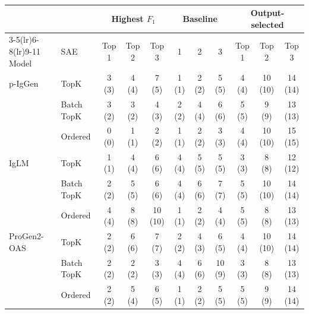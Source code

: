 \begin{table}[ht]
\centering\revcolor\footnotesize
\caption{}
\label{tab:rl_depth}
\setlength{\tabcolsep}{2.5pt}
\begin{tabular}{llccccccccc}
\toprule
 & & \multicolumn{3}{c}{Highest $F_1$} & \multicolumn{3}{c}{Baseline} & \multicolumn{3}{c}{Output-selected} \\
\cmidrule(lr){3-5}\cmidrule(lr){6-8}\cmidrule(lr){9-11}
Model & SAE & Top 1 & Top 2 & Top 3 & 1 & 2 & 3 & Top 1 & Top 2 & Top 3 \\
\midrule
p-IgGen & TopK & 3 (3) & 4 (4) & 7 (5) & 1 (1) & 2 (2) & 5 (5) & 4 (4) & 10 (10) & 14 (14) \\
 & Batch TopK & 3 (2) & 3 (2) & 4 (3) & 2 (2) & 4 (4) & 6 (6) & 5 (5) & 9 (9) & 13 (13) \\
 & Ordered & 0 (0) & 1 (1) & 2 (2) & 1 (1) & 2 (2) & 3 (3) & 4 (4) & 10 (10) & 15 (15) \\
\midrule
IgLM & TopK & 1 (1) & 4 (4) & 6 (6) & 4 (4) & 5 (5) & 5 (5) & 3 (3) & 8 (8) & 12 (12) \\
 & Batch TopK & 2 (2) & 5 (5) & 6 (6) & 4 (4) & 6 (6) & 7 (7) & 5 (5) & 10 (10) & 14 (14) \\
 & Ordered & 4 (4) & 8 (8) & 10 (10) & 1 (1) & 2 (2) & 4 (4) & 5 (5) & 8 (8) & 13 (13) \\
\midrule
ProGen2-OAS & TopK & 2 (2) & 6 (6) & 7 (7) & 2 (2) & 4 (3) & 6 (5) & 4 (4) & 10 (10) & 14 (14) \\
 & Batch TopK & 2 (2) & 2 (2) & 3 (3) & 4 (4) & 6 (6) & 10 (9) & 3 (3) & 8 (8) & 13 (13) \\
 & Ordered & 2 (2) & 5 (4) & 6 (5) & 1 (1) & 2 (2) & 5 (5) & 5 (5) & 9 (9) & 14 (14) \\
\bottomrule
\end{tabular}
\end{table}

